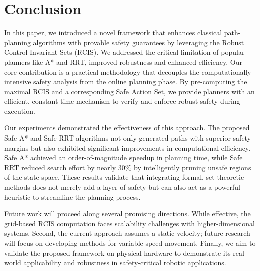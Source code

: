 \documentclass[conference]{IEEEtran}
\begin{document}
\section{Conclusion}
\label{sec:conclusion}
In this paper, we introduced a novel framework that enhances classical path-planning algorithms with provable safety guarantees by leveraging the  Robust Control Invariant Sets (RCIS). We addressed the critical limitation of popular planners like A* and RRT, improved robustness and enhanced efficiency. Our core contribution is a practical methodology that decouples the computationally intensive safety analysis from the online planning phase. By pre-computing the maximal RCIS and a corresponding Safe Action Set, we provide planners with an efficient, constant-time mechanism to verify and enforce robust safety during execution.

Our experiments demonstrated the effectiveness of this approach. The proposed Safe A* and Safe RRT algorithms not only generated paths with superior safety margins but also exhibited significant improvements in computational efficiency. Safe A* achieved an order-of-magnitude speedup in planning time, while Safe RRT reduced search effort by nearly 30\% by intelligently pruning unsafe regions of the state space. These results validate that integrating formal, set-theoretic methods does not merely add a layer of safety but can also act as a powerful heuristic to streamline the planning process.

Future work will proceed along several promising directions. While effective, the grid-based RCIS computation faces scalability challenges with higher-dimensional systems. Second, the current approach assumes a static velocity; future research will focus on developing methods for variable-speed movement. Finally, we aim to validate the proposed framework on physical hardware to demonstrate its real-world applicability and robustness in safety-critical robotic applications.
\end{document}
